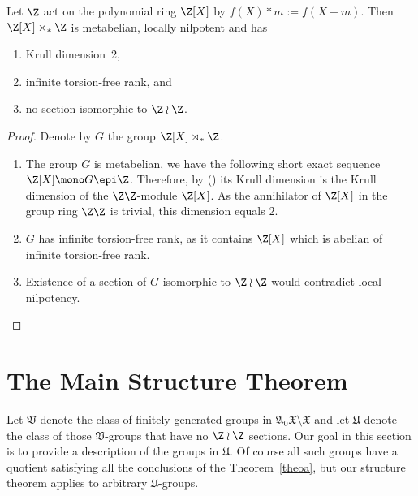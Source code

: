 

\begin{exam}\label{Krull infinite tf rk and sections}
Let $\Z$ act on the polynomial ring $\Z[X]$ by $f(X)*m:=f(X+m)$. Then $\Z[X]\rtimes_*\Z$ is metabelian, locally nilpotent and has
\begin{enumerate}\romanenumi
\item \label{list2.13.1}Krull dimension~2,
\item \label{list2.13.2}infinite torsion-free rank, and
\item \label{list2.13.3}no section isomorphic to $\Z\wr\Z$.
\end{enumerate}
\end{exam}


\begin{proof}
Denote by $G$ the group $\Z[X]\rtimes_*\Z$.
\begin{enumerate}\romanenumi
\item[{\eqref{list2.13.1}}] The group $G$ is metabelian, we have the following short exact sequence $\Z[X] \mono G \epi \Z$. Therefore, by (\cite[Proposition~2.24]{J}) its Krull dimension is the Krull dimension of the $\Z\Z$-module $\Z[X]$. As the annihilator of $\Z[X]$ in the group ring $\Z\Z$ is trivial, this dimension equals $2$.
\item[{\eqref{list2.13.2}}] $G$ has infinite torsion-free rank, as it contains $\Z[X]$ which is abelian of infinite torsion-free rank.
\item[{\eqref{list2.13.3}}] Existence of a section of $G$ isomorphic to $\Z\wr\Z$ would contradict local nilpotency.\qedhere
\end{enumerate}
\end{proof}



\section{The Main Structure Theorem}\label{sect-3}

Let $\mathfrak V$ denote the class of finitely generated groups in $\mathfrak A_0\mathfrak X\setminus\mathfrak X$ and let $\mathfrak U$ denote the class of those $\mathfrak V$-groups that have no $\Z\wr\Z$ sections. Our goal in this section is to provide a description of the groups in $\mathfrak U$. Of course all such groups have a quotient satisfying all the conclusions of the Theorem~\ref{theoa}, but our structure theorem applies to arbitrary $\mathfrak U$-groups.


